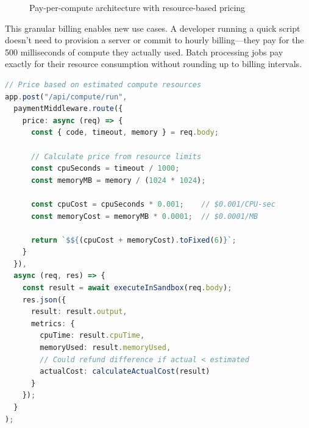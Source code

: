 \begin{figure}[htbp]
\centering
{}
\caption{Pay-per-compute architecture with resource-based pricing}
\label{fig:compute-architecture}
\end{figure}

This granular billing enables new use cases. A developer running a quick script doesn't need to provision a server or commit to hourly billing---they pay for the 500 milliseconds of compute they actually used. Batch processing jobs pay exactly for their resource consumption without rounding up to billing intervals.

\begin{lstlisting}[language=typescript,caption={Serverless compute with resource-based pricing}]
// Price based on estimated compute resources
app.post("/api/compute/run",
  paymentMiddleware.route({
    price: async (req) => {
      const { code, timeout, memory } = req.body;

      // Calculate price from resource limits
      const cpuSeconds = timeout / 1000;
      const memoryMB = memory / (1024 * 1024);

      const cpuCost = cpuSeconds * 0.001;    // $0.001/CPU-sec
      const memoryCost = memoryMB * 0.0001;  // $0.0001/MB

      return `$${(cpuCost + memoryCost).toFixed(6)}`;
    }
  }),
  async (req, res) => {
    const result = await executeInSandbox(req.body);
    res.json({
      result: result.output,
      metrics: {
        cpuTime: result.cpuTime,
        memoryUsed: result.memoryUsed,
        // Could refund difference if actual < estimated
        actualCost: calculateActualCost(result)
      }
    });
  }
);
\end{lstlisting}


